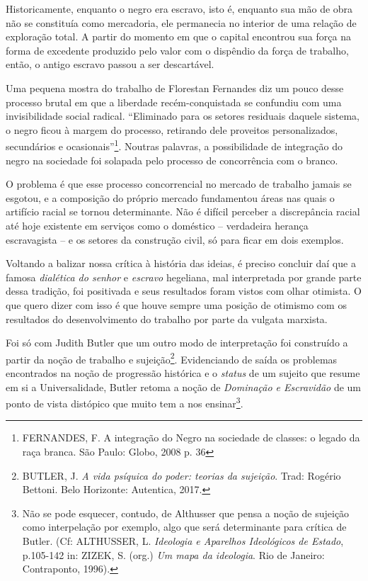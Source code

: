 Historicamente, enquanto o negro era escravo, isto é, enquanto sua mão
de obra não se constituía como mercadoria, ele permanecia no interior de
uma relação de exploração total. A partir do momento em que o capital
encontrou sua força na forma de excedente produzido pelo valor com o
dispêndio da força de trabalho, então, o antigo escravo passou a ser
descartável.

Uma pequena mostra do trabalho de Florestan Fernandes diz um pouco desse
processo brutal em que a liberdade recém-conquistada se confundiu com
uma invisibilidade social radical. ``Eliminado para os setores residuais
daquele sistema, o negro ficou à margem do processo, retirando dele
proveitos personalizados, secundários e ocasionais''\footnote{FERNANDES,
  F. A integração do Negro na sociedade de classes: o legado da raça
  branca. São Paulo: Globo, 2008 p. 36}. Noutras palavras, a
possibilidade de integração do negro na sociedade foi solapada pelo
processo de concorrência com o branco.

O problema é que esse processo concorrencial no mercado de trabalho
jamais se esgotou, e a composição do próprio mercado fundamentou áreas
nas quais o artifício racial se tornou determinante. Não é difícil
perceber a discrepância racial até hoje existente em serviços como o
doméstico -- verdadeira herança escravagista -- e os setores da
construção civil, só para ficar em dois exemplos.

Voltando a balizar nossa crítica à história das ideias, é preciso
concluir daí que a famosa \emph{dialética do senhor} e \emph{escravo}
hegeliana, mal interpretada por grande parte dessa tradição, foi
positivada e seus resultados foram vistos com olhar otimista. O que
quero dizer com isso é que houve sempre uma posição de otimismo com os
resultados do desenvolvimento do trabalho por parte da vulgata marxista.

Foi só com Judith Butler que um outro modo de interpretação foi
construído a partir da noção de trabalho e sujeição\footnote{BUTLER, J.
  \emph{A vida psíquica do poder: teorias da sujeição}. Trad: Rogério
  Bettoni. Belo Horizonte: Autentica, 2017.}. Evidenciando de saída os
problemas encontrados na noção de progressão histórica e o \emph{status}
de um sujeito que resume em si a Universalidade, Butler retoma a noção
de \emph{Dominação e Escravidão} de um ponto de vista distópico que
muito tem a nos ensinar\footnote{Não se pode esquecer, contudo, de
  Althusser que pensa a noção de sujeição como interpelação por exemplo,
  algo que será determinante para crítica de Butler. (Cf: ALTHUSSER, L.
  \emph{Ideologia e Aparelhos Ideológicos de Estado}, p.105-142 in:
  ZIZEK, S. (org.) \emph{Um mapa da ideologia}. Rio de Janeiro:
  Contraponto, 1996).}.

